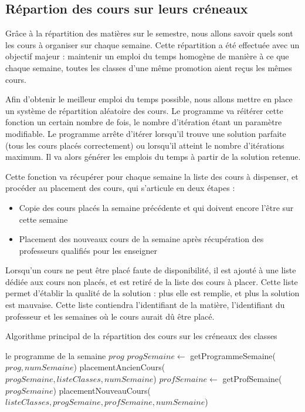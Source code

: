 \subsection{Répartion des cours sur leurs créneaux}

Grâce à la répartition des matières sur le semestre, nous allons savoir quels sont les cours à organiser sur chaque semaine. Cette répartition a été effectuée avec un objectif majeur : maintenir un emploi du temps homogène de manière à ce que chaque semaine, toutes les classes d'une même promotion aient reçus les mêmes cours.

Afin d'obtenir le meilleur emploi du temps possible, nous allons mettre en place un système de répartition aléatoire des cours. Le programme va réitérer cette fonction un certain nombre de fois, le nombre d'itération étant un paramètre modifiable. Le programme arrête d'itérer lorsqu'il trouve une solution parfaite (tous les cours placés correctement) ou lorsqu'il atteint le nombre d'itérations maximum. Il va alors générer les emplois du temps à partir de la solution retenue.

Cette fonction va récupérer pour chaque semaine la liste des cours à dispenser, et procéder au placement des cours, qui s'articule en deux étapes :\\

\begin{itemize}
\item Copie des cours placés la semaine précédente et qui doivent encore l'être sur cette semaine
\item Placement des nouveaux cours de la semaine après récupération des professeurs qualifiés pour les enseigner\\
\end{itemize}

Lorsqu'un cours ne peut être placé faute de disponibilité, il est ajouté à une liste dédiée aux cours non placés, et est retiré de la liste des cours à placer. Cette liste permet d'établir la qualité de la solution : plus elle est remplie, et plus la solution est mauvaise. Cette liste contiendra l'identifiant de la matière, l'identifiant du professeur et les semaines où le cours aurait dû être placé.

\newpage

\begin{algorithm}
\caption {Algorithme principal de la répartition des cours sur les créneaux des classes}
\begin{algorithmic}
\REQUIRE le programme de la semaine $prog$
\STATE $progSemaine \leftarrow$ getProgrammeSemaine($prog, numSemaine$)
\STATE placementAncienCours($progSemaine, listeClasses, numSemaine$)
\STATE $profSemaine \leftarrow$ getProfSemaine($progSemaine$)
\STATE placementNouveauCours($listeClasses, progSemaine, profSemaine, numSemaine$)
\ENDIF
{}
\ENDIF
\ENDFOR
{}
\end{algorithmic}
\end{algorithm}

